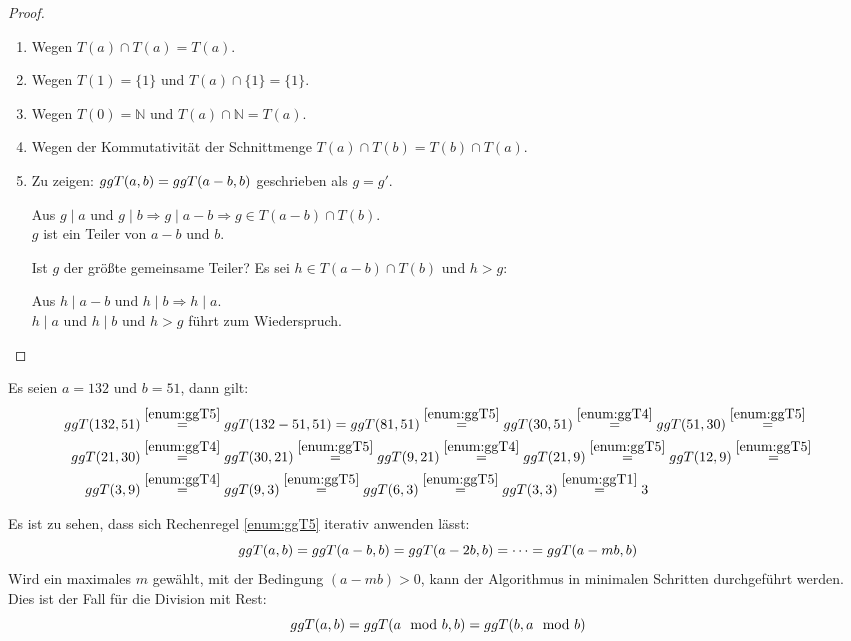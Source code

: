 \begin{proof}\mbox{}
  \begin{enumerate}
    \item Wegen $T(a) \cap T(a) = T(a)$.
    \item Wegen $T(1) = \{1\}$ und $T(a) \cap \{1\} = \{1\}$.
    \item Wegen $T(0) = \mathbb{N}$ und $T(a) \cap \mathbb{N} = T(a)$.
    \item Wegen der Kommutativität der Schnittmenge $T(a) \cap T(b) = T(b)\cap T(a)$.\newpage
    \item Zu zeigen: $ggT(a,b) = ggT(a - b,b)$ geschrieben als $g = g'$.
          \begin{center}
            Aus $g \mid a$ und $g \mid b \Rightarrow g \mid a-b \Rightarrow g \in T(a-b) \cap T(b)$.\\
            $g$ ist ein Teiler von $a-b$ und $b$.
          \end{center}
          Ist $g$ der größte gemeinsame Teiler?
          Es sei $h \in T(a-b) \cap T(b)$ und $h > g$:
          \begin{center}
            Aus $h \mid a-b$ und $h \mid b \Rightarrow h \mid a$.\\
            $h \mid a$ und $h \mid b$ und $h > g$ führt zum Wiederspruch.
          \end{center}
  \end{enumerate}
\end{proof}

\begin{example}
  Es seien $a=132$ und $b=51$, dann gilt:
  \begin{align*}
    ggT(132,51) & \stackrel{\ref{enum:ggT5}}{=} ggT(132 - 51,51) =
    ggT(81,51) \stackrel{\ref{enum:ggT5}}{=} ggT(30,51) \stackrel{\ref{enum:ggT4}}{=}
    ggT(51,30) \stackrel{\ref{enum:ggT5}}{=}                                          \\
    ggT(21,30)  & \stackrel{\ref{enum:ggT4}}{=}  ggT(30,21) \stackrel{\ref{enum:ggT5}}{=}
    ggT(9,21) \stackrel{\ref{enum:ggT4}}{=}
    ggT(21,9) \stackrel{\ref{enum:ggT5}}{=} ggT(12,9) \stackrel{\ref{enum:ggT5}}{=}       \\
    ggT(3,9)    & \stackrel{\ref{enum:ggT4}}{=} ggT(9,3) \stackrel{\ref{enum:ggT5}}{=}
    ggT(6,3) \stackrel{\ref{enum:ggT5}}{=} ggT(3,3) \stackrel{\ref{enum:ggT1}}{=} 3
  \end{align*}
\end{example}

\noindent
Es ist zu sehen, dass sich Rechenregel \ref{enum:ggT5} iterativ anwenden lässt:
\begin{equation*}
  ggT(a,b) = ggT(a-b,b) = ggT(a-2b,b) = \dots = ggT(a-mb,b)
\end{equation*}
Wird ein maximales $m$ gewählt, mit der Bedingung $(a-mb) > 0$, kann der Algorithmus
in minimalen Schritten durchgeführt werden. Dies ist der Fall für die Division mit Rest:
\begin{equation*}
  ggT(a,b) = ggT(a \mod{b},b) = ggT(b,a \mod{b})
\end{equation*}

